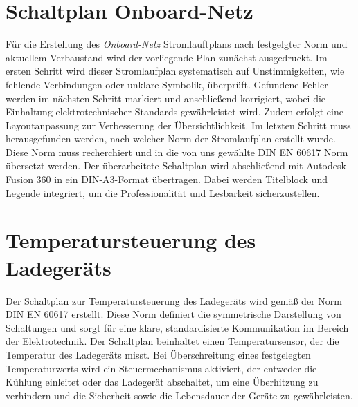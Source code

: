 \section*{Schaltplan Onboard-Netz}
Für die Erstellung des \textit{Onboard-Netz} Stromlauftplans nach festgelgter Norm und aktuellem Verbaustand wird der vorliegende Plan zunächst ausgedruckt. Im ersten Schritt wird dieser Stromlaufplan systematisch auf Unstimmigkeiten, wie fehlende Verbindungen oder unklare Symbolik, überprüft. Gefundene Fehler werden im nächsten Schritt markiert und anschließend korrigiert, wobei die Einhaltung elektrotechnischer Standards gewährleistet wird. Zudem erfolgt eine Layoutanpassung zur Verbesserung der Übersichtlichkeit. Im letzten Schritt muss herausgefunden werden, nach welcher Norm der Stromlaufplan erstellt wurde. Diese Norm muss recherchiert und in die von uns gewählte DIN EN 60617 Norm \glqq übersetzt\grqq {} werden. Der überarbeitete Schaltplan wird abschließend mit Autodesk Fusion 360 in ein DIN-A3-Format übertragen. Dabei werden Titelblock und Legende integriert, um die Professionalität und Lesbarkeit sicherzustellen. 
 
\addtocounter{page}{1} 
\section*{Temperatursteuerung des Ladegeräts}
Der Schaltplan zur Temperatursteuerung des Ladegeräts wird gemäß der Norm DIN EN 60617 erstellt. Diese Norm definiert die symmetrische Darstellung von Schaltungen und sorgt für eine klare, standardisierte Kommunikation im Bereich der Elektrotechnik. Der Schaltplan beinhaltet einen Temperatursensor, der die Temperatur des Ladegeräts misst. Bei Überschreitung eines festgelegten Temperaturwerts wird ein Steuermechanismus aktiviert, der entweder die Kühlung einleitet oder das Ladegerät abschaltet, um eine Überhitzung zu verhindern und die Sicherheit sowie die Lebensdauer der Geräte zu gewährleisten.
% 
\addtocounter{page}{1} 
